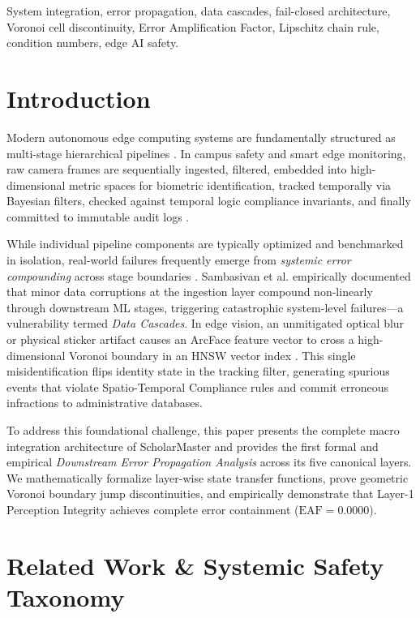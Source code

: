 \documentclass[conference]{IEEEtran}
\begin{document}
\begin{IEEEkeywords}
System integration, error propagation, data cascades, fail-closed architecture, Voronoi cell discontinuity, Error Amplification Factor, Lipschitz chain rule, condition numbers, edge AI safety.
\end{IEEEkeywords}

\section{Introduction}
Modern autonomous edge computing systems are fundamentally structured as multi-stage hierarchical pipelines \cite{sculley2015hidden, sambasivan2021everyone}. In campus safety and smart edge monitoring, raw camera frames are sequentially ingested, filtered, embedded into high-dimensional metric spaces for biometric identification, tracked temporally via Bayesian filters, checked against temporal logic compliance invariants, and finally committed to immutable audit logs \cite{kumar2026scholar22}.

While individual pipeline components are typically optimized and benchmarked in isolation, real-world failures frequently emerge from \textit{systemic error compounding} across stage boundaries \cite{leveson1995safeware, avizienis2004basic}. Sambasivan et al. \cite{sambasivan2021everyone} empirically documented that minor data corruptions at the ingestion layer compound non-linearly through downstream ML stages, triggering catastrophic system-level failures---a vulnerability termed \textit{Data Cascades}. In edge vision, an unmitigated optical blur or physical sticker artifact causes an ArcFace feature vector to cross a high-dimensional Voronoi boundary in an HNSW vector index \cite{deng2019arcface, malkov2018efficient}. This single misidentification flips identity state in the tracking filter, generating spurious events that violate Spatio-Temporal Compliance rules and commit erroneous infractions to administrative databases.

To address this foundational challenge, this paper presents the complete macro integration architecture of ScholarMaster and provides the first formal and empirical \textit{Downstream Error Propagation Analysis} across its five canonical layers. We mathematically formalize layer-wise state transfer functions, prove geometric Voronoi boundary jump discontinuities, and empirically demonstrate that Layer-1 Perception Integrity achieves complete error containment ($\text{EAF} = 0.0000$).

\section{Related Work \& Systemic Safety Taxonomy}
\end{document}
